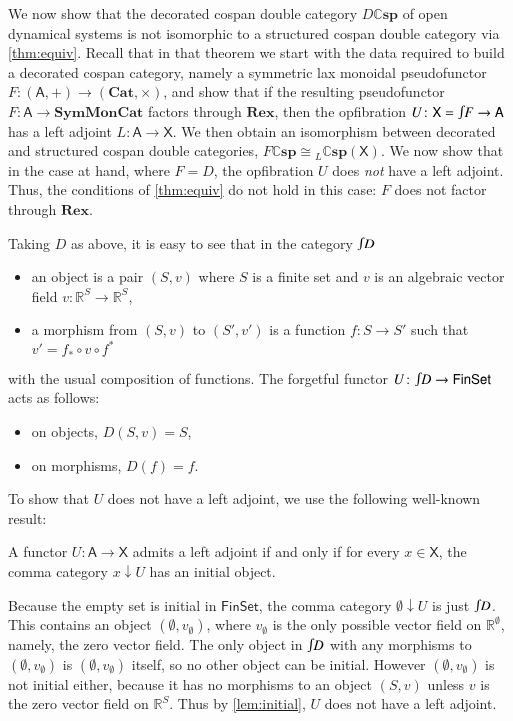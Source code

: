 \documentclass[reqno]{amsart}
\newcommand{\R}{\mathbb{R}}
\let\maps\colon
\theoremstyle{definition}
\theoremstyle{remark}
\newcommand{\Set}{\mathsf{Set}}
\newcommand{\A}{\mathsf{A}}
\newcommand{\X}{\mathsf{X}}
\newcommand{\Fin}{\mathsf{Fin}}
\newcommand{\bicat}{\mathbf}
\newcommand{\Cat}{\bicat{Cat}}
\newcommand{\Rex}{\bicat{Rex}}
\newcommand{\SMC}{\bicat{SymMonCat}}
\newcommand{\double}[1]{\mathbf{\mathbb #1}}
\newcommand{\lCsp}{\double{Csp}}
\newcommand{\inta}{\raisebox{.3\depth}{$\smallint\hspace{-.01in}$}}
\begin{document}
We now show that the decorated cospan double category $D \lCsp$ of open dynamical systems is not isomorphic to a structured cospan double category via \cref{thm:equiv}. Recall that in that theorem we start with the data required to build a decorated cospan category, namely a symmetric lax monoidal pseudofunctor $F \maps (\A,+) \to (\Cat,\times)$, and show that if the resulting pseudofunctor $F \maps \A \to \SMC$ factors through $\Rex$, then the opfibration $U \maps \X = \inta F \to \A$ has a left adjoint $L \maps \A \to \X$. We then obtain an isomorphism between decorated and structured cospan double categories, $F \lCsp \cong {}_L \lCsp(\X)$. We now show that in the case at hand, where $F = D$, the opfibration $U$ does \emph{not} have a left adjoint. Thus, the conditions of \cref{thm:equiv} do not hold in this case: $F$ does not factor through $\Rex$.

Taking $D$ as above, it is easy to see that in the category $\inta D$
\begin{itemize}
\item an object is a pair $(S,v)$ where $S$ is a finite set and $v$ is an algebraic vector field $v \maps \R^S \to \R^S$,
\item a morphism from $(S,v)$ to $(S',v')$ is a function $f \maps S \to S'$ such that $v' = f_* \circ v \circ f^*$
\end{itemize}
with the usual composition of functions.   The forgetful functor $U \maps \inta D \to \Fin\Set$ acts as follows:
\begin{itemize}
\item on objects, $D(S,v) = S$,
\item on morphisms, $D(f) = f$.
\end{itemize}

To show that $U$ does not have a left adjoint, we use the following well-known result:
\begin{lem} \label{lem:initial}
A functor $U \maps \A \to \X$ admits a left adjoint if and only if for every $x \in \X$, the comma category $x \downarrow U$ has an initial object.
\end{lem}
Because the empty set is initial in $\Fin\Set$, the comma category 
$\emptyset \downarrow U$ is just $\inta D$.  This contains an object $(\emptyset, v_\emptyset)$, where $v_\emptyset$ is the only possible vector field on $\R^\emptyset$, namely, the zero vector field.   The only object in $\inta D$ with any morphisms to $(\emptyset, v_\emptyset)$ is $(\emptyset, v_\emptyset)$ itself, so no other object can be initial.  However $(\emptyset, v_\emptyset)$ is not initial either, because it has no morphisms to an object $(S,v)$ unless $v$ is the zero vector field on $\R^S$.  Thus by \cref{lem:initial}, $U$ does not have a left adjoint.
\end{document}
